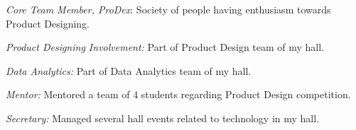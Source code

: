 \documentclass[]{deedy-resume-openfont}
\begin{document}
\begin{minipage}[t]{0.66\textwidth}
\vspace{\topsep} %
\begin{tightemize}


\item {\emph{Core Team Member, ProDex}:} Society of people having enthusiasm towards Product Designing.\\
\item{\emph{Product Designing Involvement:}} Part of Product Design team of my hall.
\item{\emph{Data Analytics:}} Part of Data Analytics team of my hall.
\item{\emph{Mentor:}} Mentored a team of 4 students regarding Product Design competition.
\item{\emph{Secretary:}} Managed several hall events related to technology in my hall.

\end{tightemize}
\sectionsep

\end{minipage} 
\end{document}
